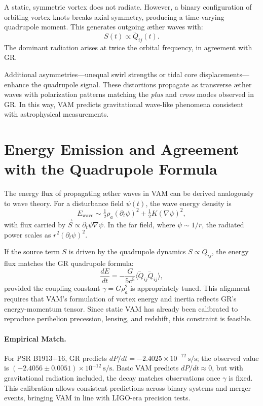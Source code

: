 A static, symmetric vortex does not radiate. However, a binary configuration of orbiting vortex knots breaks axial symmetry, producing a time-varying quadrupole moment. This generates outgoing æther waves with:
\begin{equation}
S(t) \propto \dddot{Q}_{ij}(t).
\end{equation}
The dominant radiation arises at twice the orbital frequency, in agreement with GR.

Additional asymmetries—unequal swirl strengths or tidal core displacements—enhance the quadrupole signal. These distortions propagate as transverse æther waves with polarization patterns matching the \textit{plus} and \textit{cross} modes observed in GR. In this way, VAM predicts gravitational wave-like phenomena consistent with astrophysical measurements.
\section*{Energy Emission and Agreement with the Quadrupole Formula}

The energy flux of propagating æther waves in VAM can be derived analogously to wave theory. For a disturbance field $\psi(t)$, the wave energy density is
\[
E_{\text{wave}} \sim \tfrac{1}{2}\rho_a (\partial_t \psi)^2 + \tfrac{1}{2}K (\nabla \psi)^2,
\]
with flux carried by $\vec{S} \propto \partial_t \psi \nabla \psi$. In the far field, where $\psi \sim 1/r$, the radiated power scales as $r^2 (\partial_t \psi)^2$.

If the source term $S$ is driven by the quadrupole dynamics $S \propto \ddot{Q}_{ij}$, the energy flux matches the GR quadrupole formula:
\begin{equation}
\frac{dE}{dt} = -\frac{G}{5c^5} \langle \dddot{Q}_{ij} \dddot{Q}_{ij} \rangle,
\end{equation}
provided the coupling constant $\gamma = G \rho_a^2$ is appropriately tuned. This alignment requires that VAM’s formulation of vortex energy and inertia reflects GR’s energy-momentum tensor. Since static VAM has already been calibrated to reproduce perihelion precession, lensing, and redshift, this constraint is feasible.

\paragraph{Empirical Match.}
For PSR B1913+16, GR predicts $dP/dt = -2.4025 \times 10^{-12}~\text{s/s}$; the observed value is $(-2.4056 \pm 0.0051) \times 10^{-12}~\text{s/s}$. Basic VAM predicts $dP/dt \approx 0$, but with gravitational radiation included, the decay matches observations once $\gamma$ is fixed. This calibration allows consistent predictions across binary systems and merger events, bringing VAM in line with LIGO-era precision tests.

